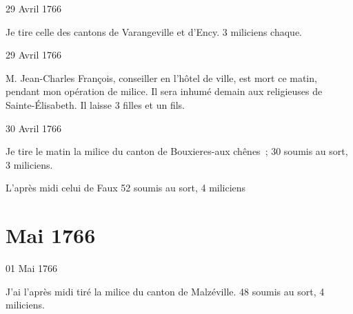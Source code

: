                      \begin{diary}{29 Avril 1766}{}
                        
                         Je tire celle des cantons de Varangeville
                           et d'Ency. 3 miliciens
                           chaque. \bigskip
        
        
                     \end{diary}
                     
                     

                     \begin{diary}{29 Avril 1766}{}
                        
                        
                           M. Jean-Charles François, conseiller en l'hôtel de ville,
                           est mort ce matin, pendant mon opération
                           de milice. Il sera inhumé demain aux religieuses
                              de Sainte-Élisabeth. Il laisse 3 filles et un fils. \bigskip
        
        
                     \end{diary}

                     \begin{diary}{30 Avril 1766}{}
                        
                         Je tire le matin la milice du canton de
                           Bouxieres-aux chênes ; 30
                           soumis au sort, 3 miliciens. \bigskip
        
        
                         L'après midi celui de Faux 52 soumis au
                           sort, 4 miliciens \bigskip
        
        
                     \end{diary}
                  \chapter*{Mai 1766}
                     
                     
                     \begin{diary}{01 Mai 1766}{}
                        
                         J'ai l'après midi tiré la milice du canton
                           de Malzéville. 48 soumis au
                           sort, 4 miliciens. \bigskip
        
        
                     \end{diary}

